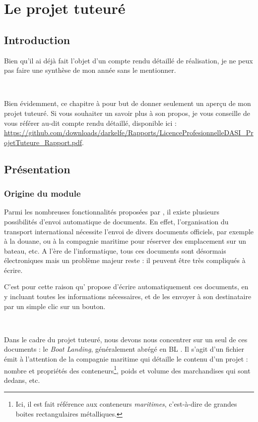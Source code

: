 \chapter{Le projet tuteuré}
\section{Introduction}
Bien qu'il ai déjà fait l'objet d'un compte rendu détaillé de réalisation, je ne peux pas faire une synthèse de mon année sans le mentionner.

~

Bien évidemment, ce chapitre à pour but de donner seulement un aperçu de mon projet tuteuré. Si vous souhaiter un savoir plus à son propos, je vous conseille de vous référer au-dit compte rendu détaillé, disponible ici : \url{https://github.com/downloads/darkelfe/Rapports/LicenceProfesionnelleDASI_ProjetTuteure_Rapport.pdf}.

\section{Présentation}
\subsection{Origine du module}
Parmi les nombreuses fonctionnalités proposées par \integrale, il existe plusieurs possibilités d'envoi automatique de documents. En effet, l'organisation du transport international nécessite l'envoi de divers documents officiels, par exemple à la douane, ou à la compagnie maritime pour réserver des emplacement sur un bateau, etc. A l'ère de l'informatique, tous ces documents sont désormais électroniques mais un problème majeur reste : il peuvent être très compliqués à écrire.

C'est pour cette raison qu'\integrale{} propose d'écrire automatiquement ces documents, en y incluant toutes les informations nécessaires, et de les envoyer à son destinataire par un simple clic sur un bouton.

~

Dans le cadre du projet tuteuré, nous devons nous concentrer sur un seul de ces documents : le \emph{Boat Landing}, généralement abrégé en
\og BL \fg. Il s'agit d'un fichier émit à l'attention de la compagnie maritime qui détaille le contenu d'un projet : nombre et propriétés des conteneurs\footnote{Ici, il est fait référence aux conteneurs \emph{maritimes}, c'est-à-dire de grandes boites rectangulaires métalliques.}, poids et volume des marchandises qui sont dedans, etc.

